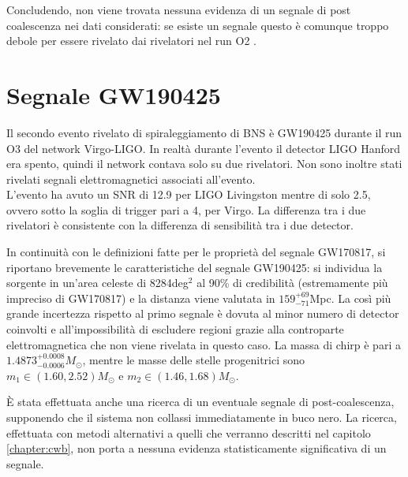 Concludendo, non viene trovata nessuna evidenza di un segnale di post coalescenza nei dati considerati: se esiste un segnale questo è comunque troppo debole per essere rivelato dai rivelatori nel run O2 \cite{Abbott_2017b}.

\section{Segnale GW190425}
Il secondo evento rivelato di spiraleggiamento di BNS è GW190425 durante il run O3 del network Virgo-LIGO. In realtà durante l'evento il detector LIGO Hanford era spento, quindi il network contava solo su due rivelatori. Non sono inoltre stati rivelati segnali elettromagnetici associati all'evento.\\
L'evento ha avuto un SNR di 12.9 per LIGO Livingston mentre di solo 2.5, ovvero sotto la soglia di trigger pari a 4, per Virgo. La differenza tra i due rivelatori è consistente con la differenza di sensibilità tra i due detector\cite{Abbott_2020b}.

In continuità con le definizioni fatte per le proprietà del segnale GW170817, si riportano brevemente le caratteristiche del segnale GW190425: si individua la sorgente in un'area celeste di 8284deg$^2$ al 90\% di credibilità (estremamente più impreciso di GW170817) e la distanza viene valutata in $159_{-71}^{+69}$Mpc. La così più grande incertezza rispetto al primo segnale è dovuta al minor numero di detector coinvolti e all'impossibilità di escludere regioni grazie alla controparte elettromagnetica che non viene rivelata in questo caso.
La massa di chirp è pari a $1.4873^{+0.0008}_{-0.0006}M_\odot$, mentre le masse delle stelle progenitrici sono $m_1 \in (1.60, 2.52)M_\odot$ e $m_2 \in (1.46, 1.68)M_\odot$\cite{Abbott_2020b}.

È stata effettuata anche una ricerca di un eventuale segnale di post-coalescenza, supponendo che il sistema non collassi immediatamente in buco nero. La ricerca, effettuata con metodi alternativi a quelli che verranno descritti nel capitolo \ref{chapter:cwb}, non porta a nessuna evidenza statisticamente significativa di un segnale.
